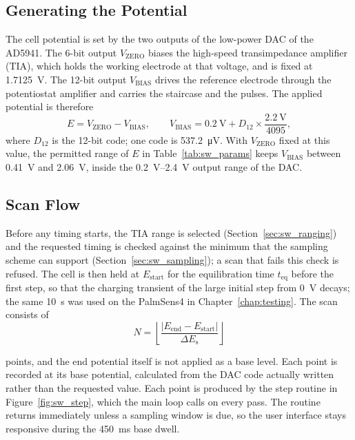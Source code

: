 \subsection{Generating the Potential}
\label{sec:sw_potential}

The cell potential is set by the two outputs of the low-power DAC of the
AD5941. The 6-bit output $V_\text{ZERO}$ biases the high-speed transimpedance
amplifier (TIA), which holds the working electrode at that voltage, and is
fixed at \SI{1.7125}{\volt}. The 12-bit output $V_\text{BIAS}$ drives
the reference electrode through the potentiostat amplifier and carries the
staircase and the pulses. The applied potential is therefore
\begin{equation}
  E = V_\text{ZERO} - V_\text{BIAS},
  \qquad
  V_\text{BIAS} = \SI{0.2}{\volt} + D_{12}\times\frac{\SI{2.2}{\volt}}{4095},
  \label{eq:sw_potential}
\end{equation}
where $D_{12}$ is the 12-bit code; one code is \SI{537.2}{\micro\volt}. With
$V_\text{ZERO}$ fixed at this value, the permitted range of $E$ in
Table~\ref{tab:sw_params} keeps $V_\text{BIAS}$ between \SI{0.41}{\volt} and
\SI{2.06}{\volt}, inside the \SIrange{0.2}{2.4}{\volt} output range of the DAC.

\subsection{Scan Flow}
\label{sec:sw_scan_flow}

Before any timing starts, the TIA range is selected (Section~\ref{sec:sw_ranging}) and the requested timing is checked against the minimum that the sampling scheme can support
(Section~\ref{sec:sw_sampling}); a scan that fails this check is refused. The cell is then held at $E_\text{start}$ for the equilibration time $t_\text{eq}$ before the first step, so that the charging transient of the large initial step from \SI{0}{\volt} decays; the same \SI{10}{\second} was used on the PalmSens4 in Chapter~\ref{chap:testing}. The scan consists of
\begin{equation}
  N = \left\lfloor \frac{\left|E_\text{end} - E_\text{start}\right|}{\Delta E_\text{s}} \right\rfloor
  \label{eq:sw_npoints}
\end{equation}

points, and the end potential itself is not applied as a base level. Each point is recorded at its base potential, calculated from the DAC code actually written rather than the requested value. Each
point is produced by the step routine in Figure~\ref{fig:sw_step}, which the
main loop calls on every pass. The routine returns immediately unless a
sampling window is due, so the user interface stays responsive during the
\SI{450}{\milli\second} base dwell.

